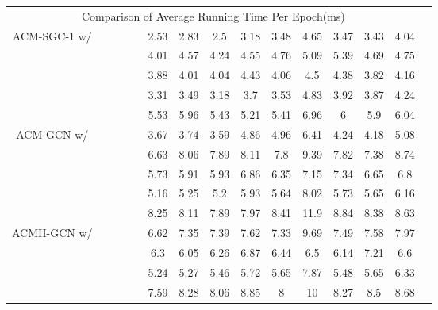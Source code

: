 \documentclass{article}
\newcommand{\0}{{\boldsymbol{0}}}
\newcommand{\6}{{\partial}}
\newcommand{\8}{{\infty}}
\newcommand{\4}{{\nabla}}
\begin{document}
\begin{table*}[htbp]
\begin{tabular}{c|cccc|ccccccccc|r}
\cmidrule{1-14}    \multicolumn{14}{c|}{Comparison of Average Running Time Per Epoch(ms)}                                        &  \\
\cmidrule{1-14}    \multicolumn{1}{c|}{\multirow{5}[2]{*}{ACM-SGC-1 w/}} &  &       &       &       & 2.53  & 2.83  & 2.5   & 3.18  & 3.48  & 4.65  & 3.47  & 3.43  & 4.04  &  \\
          &  &  &       &  & 4.01  & 4.57  & 4.24  & 4.55  & 4.76  & 5.09  & 5.39  & 4.69  & 4.75  &  \\
          &  &       &  &  & 3.88  & 4.01  & 4.04  & 4.43  & 4.06  & 4.5   & 4.38  & 3.82  & 4.16  &  \\
          &  &  &  &       & 3.31  & 3.49  & 3.18  & 3.7   & 3.53  & 4.83  & 3.92  & 3.87  & 4.24  &  \\
          &  &  &  &  & 5.53  & 5.96  & 5.43  & 5.21  & 5.41  & 6.96  & 6     & 5.9   & 6.04  &  \\
\cmidrule{1-14}    \multicolumn{1}{c|}{\multirow{5}[2]{*}{ACM-GCN w/}} &  &       &       &       & 3.67  & 3.74  & 3.59  & 4.86  & 4.96  & 6.41  & 4.24  & 4.18  & 5.08  &  \\
          &  &  &       &  & 6.63  & 8.06  & 7.89  & 8.11  & 7.8   & 9.39  & 7.82  & 7.38  & 8.74  &  \\
          &  &       &  &  & 5.73  & 5.91  & 5.93  & 6.86  & 6.35  & 7.15  & 7.34  & 6.65  & 6.8   &  \\
          &  &  &  &       & 5.16  & 5.25  & 5.2   & 5.93  & 5.64  & 8.02  & 5.73  & 5.65  & 6.16  &  \\
          &  &  &  &  & 8.25  & 8.11  & 7.89  & 7.97  & 8.41  & 11.9  & 8.84  & 8.38  & 8.63  &  \\
\cmidrule{1-14}    \multicolumn{1}{c|}{\multirow{4}[2]{*}{ACMII-GCN w/}} &  &  &       &  & 6.62  & 7.35  & 7.39  & 7.62  & 7.33  & 9.69  & 7.49  & 7.58  & 7.97  &  \\
          &  &       &  &  & 6.3   & 6.05  & 6.26  & 6.87  & 6.44  & 6.5   & 6.14  & 7.21  & 6.6   &  \\
          &  &  &  &       & 5.24  & 5.27  & 5.46  & 5.72  & 5.65  & 7.87  & 5.48  & 5.65  & 6.33  &  \\
          &  &  &  &  & 7.59  & 8.28  & 8.06  & 8.85  & 8     & 10    & 8.27  & 8.5   & 8.68  &  \\
    \bottomrule
    \bottomrule
    \end{tabular}\end{table*}
\end{document}

